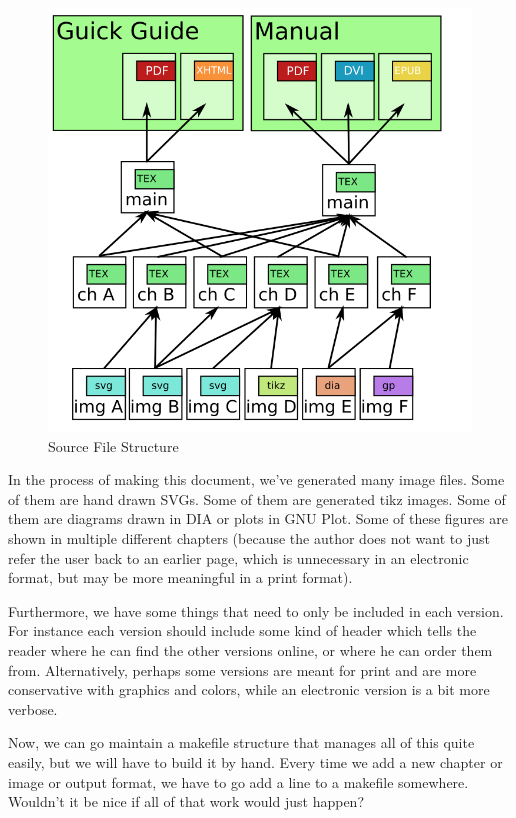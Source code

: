 \begin{figure}[H]
    \centering
    \includegraphics{fig/structure}
    \caption{Source File Structure}
\end{figure}

In the process of making this document, we've generated many image files.
%
Some of them are hand drawn SVGs.
%
Some of them are generated tikz images. 
%
Some of them are diagrams drawn in DIA or plots in GNU Plot. 
%
Some of these figures are shown in multiple different chapters (because the author does not want to just refer the user back to an earlier page, which is unnecessary in an electronic format, but may be more meaningful in a print format).

Furthermore, we have some things that need to only be included in each version. 
%
For instance each version should include some kind of header which tells the reader where he can find the other versions online, or where he can order them from. 
%
Alternatively, perhaps some versions are meant for print and are more conservative with graphics and colors, while an electronic version is a bit more verbose.

Now, we can go maintain a makefile structure that manages all of this quite easily, but we will have to build it by hand. 
%
Every time we add a new chapter or image or output format, we have to go add a line to a makefile somewhere. 
%
Wouldn't it be nice if all of that work would just happen?

